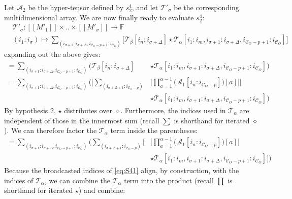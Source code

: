 \documentclass{article}
\theoremstyle{plain}
\theoremstyle{definition}
\theoremstyle{remark}
\newcommand{\cC}{\mathcal{C}}
\newcommand{\cA}{\mathcal{A}}
\newcommand{\cT}{\mathcal{T}}
\begin{document}
Let $\cA_2$ be the hyper-tensor defined by $s^4_2$, and let $\cT'_{\sigma}$ be the corresponding multidimensional array. We are now finally ready to evaluate $s^4_2$:
\begin{equation*}
	\begin{aligned}
		&\cT'_{\sigma}: [[M'_1]]  \times .. \times [[M'_{\sigma}]] \rightarrow \mathbb{F}\\
		&(i_1 : i_{\sigma}) \mapsto \sum_{(i_{\sigma + 1} : i_{\sigma + \Delta}, i_{\cC_O - p + 1} : i_{\cC_O})} \Bigg[ \cT_{\beta}[i_n : i_{\sigma + \Delta}] \star \cT_{\alpha}[i_1 : i_m, i_{\sigma + 1} : i_{\sigma + \Delta}, i_{\cC_O - p + 1} : i_{\cC_O}] \Bigg]
	\end{aligned}
\end{equation*}
expanding out the above gives:
\begin{equation*}
	\begin{aligned}
		= \sum_{(i_{\sigma + 1} : i_{\sigma + \Delta}, i_{\cC_O - p + 1} : i_{\cC_O})} \Bigg( \cT_{\beta}[i_n : i_{\sigma + \Delta}] &\star \cT_{\alpha}[i_1 : i_m, i_{\sigma + 1} : i_{\sigma + \Delta}, i_{\cC_O - p + 1} : i_{\cC_O}] \Bigg)\\
		= \sum_{(i_{\sigma + 1} : i_{\sigma + \Delta}, i_{\cC_O - p + 1} : i_{\cC_O})} \Bigg( \Bigg[ \sum_{(i_{\sigma + \Delta + 1} : i_{\cC_O - p})} &\Bigg[ \prod_{a=1}^{\alpha - 1} \big(\cA_1[i_n : i_{\cC_O - p}] \big)[a] \Bigg] \Bigg]\\
		& \star \cT_{\alpha}[i_1 : i_m, i_{\sigma + 1} : i_{\sigma + \Delta}, i_{\cC_O - p + 1} : i_{\cC_O}] \Bigg)
	\end{aligned}
\end{equation*}
By hypothesis 2, $\star$ distributes over $\diamond$. Furthermore, the indices used in $\cT_{\alpha}$ are independent of those in the innermost sum (recall $\sum$ is shorthand for iterated $\diamond$). We can therefore factor the $\cT_{\alpha}$ term inside the parentheses:
\begin{equation*}
	\begin{aligned}
		= \sum_{(i_{\sigma + 1} : i_{\sigma + \Delta}, i_{\cC_O - p + 1} : i_{\cC_O})} \Bigg(  \sum_{(i_{\sigma + \Delta + 1} : i_{\cC_O - p})} \Bigg[&\Bigg[ \prod_{a=1}^{\alpha - 1} \big(\cA_1[i_n : i_{\cC_O - p}] \big)[a] \Bigg] \\
		& \star \cT_{\alpha}[i_1 : i_m, i_{\sigma + 1} : i_{\sigma + \Delta}, i_{\cC_O - p + 1} : i_{\cC_O}] \Bigg] \Bigg)
	\end{aligned}
\end{equation*}
Because the broadcasted indices of \cref{eq:S41} align, by construction, with the indices of $\cT_{\alpha}$, we can combine the $\cT_{\alpha}$ term into the product (recall $\prod$ is shorthand for iterated $\star$) and combine:
\end{document}

